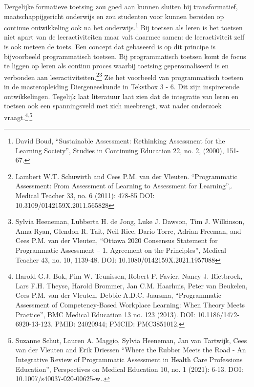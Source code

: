 \documentclass[empirical, authordate, ]{new-jote-article}
\begin{document}
Dergelijke formatieve toetsing zou goed aan kunnen sluiten bij transformatief, maatschappijgericht onderwijs en zou studenten voor kunnen bereiden op continue ontwikkeling ook na het onderwijs.\footnote{David Boud, “Sustainable Assessment: Rethinking Assessment for the Learning Society”, Studies in Continuing Education 22, no. 2, (2000), 151-67.} Bij toetsen als leren is het toetsen niet apart van de leeractiviteiten maar valt daarmee samen: de leeractiviteit zelf is ook meteen de toets. Een concept dat gebaseerd is op dit principe is bijvoorbeeld programmatisch toetsen. Bij programmatisch toetsen komt de focus te liggen op leren als continu proces waarbij toetsing gepersonaliseerd is en verbonden aan leeractiviteiten.\footnote{Lambert W.T. Schuwirth and Cees P.M. van der Vleuten. “Programmatic Assessment: From Assessment of Learning to Assessment for Learning”,. Medical Teacher 33, no. 6 (2011): 478-85 DOI: 10.3109/0142159X.2011.565828}\footnote{Sylvia Heeneman, Lubberta H. de Jong, Luke J. Dawson, Tim J. Wilkinson, Anna Ryan, Glendon R. Tait, Neil Rice, Dario Torre, Adrian Freeman, and Cees P.M. van der Vleuten, “Ottawa 2020 Consensus Statement for Programmatic Assessment -- 1. Agreement on the Principles”, Medical Teacher 43, no. 10, 1139-48. DOI: 10.1080/0142159X.2021.1957088} Zie het voorbeeld van programmatisch toetsen in de masteropleiding Diergeneeskunde in Tekstbox 3 - 6. Dit zijn inspirerende ontwikkelingen. Tegelijk laat literatuur laat zien dat de integratie van leren en toetsen ook een spanningsveld met zich meebrengt, wat nader onderzoek vraagt.\footnote{Harold G.J. Bok, Pim W. Teunissen, Robert P. Favier, Nancy J. Rietbroek, Lars F.H. Theyse, Harold Brommer, Jan C.M. Haarhuis, Peter van Beukelen, Cees P.M. van der Vleuten, Debbie A.D.C. Jaarsma, “Programmatic Assessment of Competency-Based Workplace Learning: When Theory Meets Practice”, BMC Medical Education 13 no. 123 (2013). DOI: 10.1186/1472-6920-13-123. PMID: 24020944; PMCID: PMC3851012.}\textsuperscript{,}\footnote{Suzanne Schut, Lauren A. Maggio, Sylvia Heeneman, Jan van Tartwijk, Cees van der Vleuten and Erik Driessen “Where the Rubber Meets the Road - An Integrative Review of Programmatic Assessment in Health Care Professions Education”, Perspectives on Medical Education 10, no. 1 (2021): 6-13. DOI: 10.1007/s40037-020-00625-w..}
\end{document}
